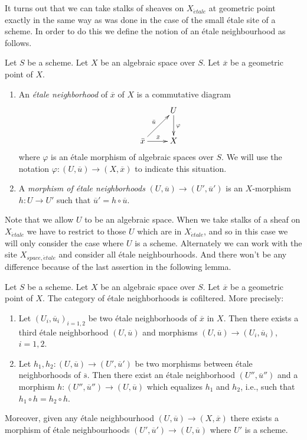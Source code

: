 \noindent
It turns out that we can take stalks of sheaves on $X_{\acute{e}tale}$
at geometric point exactly in the same way as was done in the
case of the small \'etale site of a scheme. In order to do this we
define the notion of an \'etale neighbourhood as follows.

\begin{definition}
\label{definition-etale-neighbourhood}
Let $S$ be a scheme. Let $X$ be an algebraic space over $S$.
Let $\overline{x}$ be a geometric point of $X$.
\begin{enumerate}
\item An {\it \'etale neighborhood} of $\overline{x}$
of $X$ is a commutative diagram
$$
\xymatrix{
& U \ar^{\varphi}[d] \\
{\bar x} \ar^{\bar x}[r] \ar^{\bar u}[ur] & X
}
$$
where $\varphi$ is an \'etale morphism of algebraic spaces over $S$.
We will use the notation $\varphi : (U, \overline{u}) \to (X, \overline{x})$
to indicate this situation.
\item A {\it morphism of \'etale neighborhoods}
$(U, \overline{u}) \to (U', \overline{u}')$
is an $X$-morphism $h : U \to U'$
such that $\overline{u}' = h \circ \overline{u}$.
\end{enumerate}
\end{definition}

\noindent
Note that we allow $U$ to be an algebraic space. When we take stalks
of a sheaf on $X_{\acute{e}tale}$ we have to restrict to those $U$ which
are in $X_{\acute{e}tale}$, and so in this case we will only consider the case
where $U$ is a scheme. Alternately we can work with the site
$X_{space, \acute{e}tale}$ and consider all \'etale neighbourhoods. And there
won't be any difference because of the last assertion in the following lemma.

\begin{lemma}
\label{lemma-cofinal-etale}
Let $S$ be a scheme. Let $X$ be an algebraic space over $S$.
Let $\overline{x}$ be a geometric point of $X$.
The category of \'etale neighborhoods is cofiltered. More precisely:
\begin{enumerate}
\item Let $(U_i, \overline{u}_i)_{i = 1, 2}$ be two \'etale neighborhoods of
$\overline{x}$ in $X$. Then there exists a third \'etale neighborhood
$(U, \overline{u})$ and morphisms
$(U, \overline{u}) \to (U_i, \overline{u}_i)$, $i = 1, 2$.
\item Let $h_1, h_2: (U, \overline{u}) \to (U', \overline{u}')$ be two
morphisms between \'etale neighborhoods of $\overline{s}$. Then there exist an
\'etale neighborhood $(U'', \overline{u}'')$ and a morphism
$h : (U'', \overline{u}'') \to (U, \overline{u})$
which equalizes $h_1$ and $h_2$, i.e., such that
$h_1 \circ h = h_2 \circ h$.		
\end{enumerate}
Moreover, given any \'etale neighbourhood
$(U, \overline{u}) \to (X, \overline{x})$
there exists a morphism of \'etale neighbourhoods
$(U', \overline{u}') \to (U, \overline{u})$
where $U'$ is a scheme.
\end{lemma}

